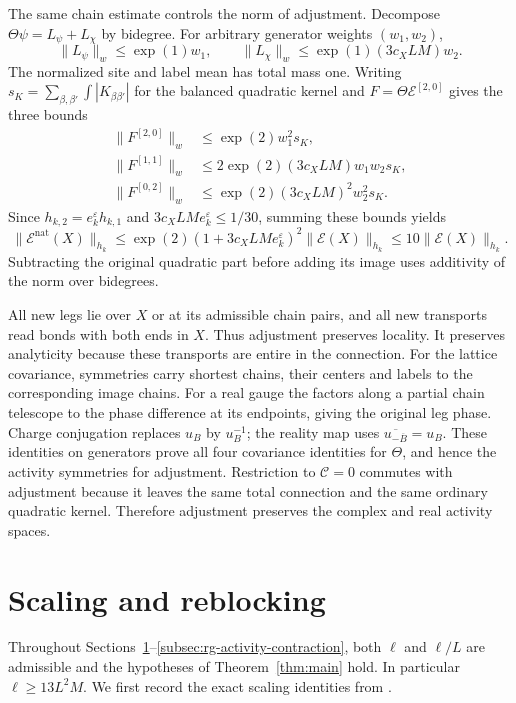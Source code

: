 The same chain estimate controls the norm of adjustment.
Decompose $\Theta\psi=L_\psi+L_\chi$ by bidegree. For arbitrary
generator weights $(w_1,w_2)$,
\[
 \|L_\psi\|_w\le\exp(1)w_1,\qquad
 \|L_\chi\|_w\le\exp(1)(3c_XLM)w_2.
\]
The normalized site and label mean has total mass one.
Writing $s_K=\sum_{\beta,\beta'}\int|K_{\beta\beta'}|$ for
the balanced quadratic kernel and $F=\Theta\mathscr E^{[2,0]}$
gives the three bounds
\[
 \begin{aligned}
 \|F^{[2,0]}\|_w&\le\exp(2)w_1^2s_K,\\
 \|F^{[1,1]}\|_w&\le2\exp(2)(3c_XLM)w_1w_2s_K,\\
 \|F^{[0,2]}\|_w&\le\exp(2)(3c_XLM)^2w_2^2s_K.
 \end{aligned}
\]
Since $h_{k,2}=e_k^\varepsilon h_{k,1}$ and
$3c_XLM e_k^\varepsilon\le1/30$, summing these bounds yields
\begin{equation}\label{eq:rg-adjustment-norm}
 \|\mathscr E^{\mathrm{nat}}(X)\|_{h_k}
 \le\exp(2)(1+3c_XLM e_k^\varepsilon)^2\|\mathscr E(X)\|_{h_k}
                                               \le10\|\mathscr E(X)\|_{h_k}.
\end{equation}
Subtracting the original quadratic part before adding its
image uses additivity of the norm over bidegrees.

All new legs lie over $X$ or at its admissible chain pairs,
and all new transports read bonds with both ends in $X$.
Thus adjustment preserves locality. It preserves analyticity
because these transports are entire in the connection.
For the lattice covariance, symmetries carry shortest chains,
their centers and labels to the corresponding image chains.
For a real gauge the factors along a partial chain telescope
to the phase difference at its endpoints, giving the original
leg phase. Charge conjugation replaces $u_B$ by $u_B^{-1}$;
the reality map uses $\overline{u_{-\overline B}}=u_B$.
These identities on generators prove all four covariance
identities for $\Theta$, and hence the activity symmetries
for adjustment. Restriction to $\mathscr C=0$ commutes with
adjustment because it leaves the same total connection and
the same ordinary quadratic kernel. Therefore adjustment
preserves the complex and real activity spaces.
\section{Scaling and reblocking}\label{subsec:rg-scaling}

Throughout Sections~\ref{subsec:rg-scaling}--\ref{subsec:rg-activity-contraction},
both $\ell$ and $\ell/L$ are admissible and the hypotheses of
Theorem~\ref{thm:main} hold. In particular $\ell\ge13L^2M$.
We first record the exact scaling identities from
\cite[\S12.6]{QED3Manuscript}.

